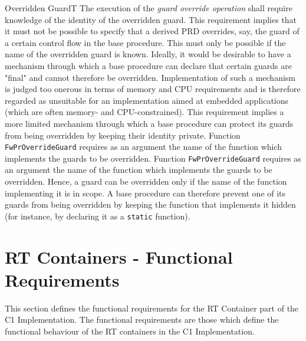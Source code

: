 \documentclass[a4paper,10pt]{article}
\let\stdsection\section
\renewcommand\section{\newpage\stdsection}
\newenvironment{fw_req_note}[7]
{\addtocounter{subsubsection}{1}
	\hspace{0.2cm}\textbf{FW-\arabic{section}.\arabic{subsection}.\arabic{subsubsection}/#2
	\hspace{0.8cm} #1}
	\vspace{-10pt}
\begin{longtable}{p{2.7cm}P{8.5cm}}
\hline
\textsc{Requirement} & #3 \\
\textsc{Note} & #4 \\
\textsc{Justification} & #5 \\
\textsc{Implementation} & #6  \\ 
\textsc{Verification} & #7  \\
\hline
}
{\end{longtable}}
\begin{document}
\begin{fw_req_note}{Overridden Guard}{T}
{The execution of the \emph{guard override operation} shall require knowledge of the identity of the overridden guard.}
{This requirement implies that it must not be possible to specify that a derived PRD overrides, say, the guard of a certain control flow in the base procedure. 
This must only be possible if the name of the overridden guard is known.}
{Ideally, it would be desirable to have a mechanism through which a base procedure can declare that certain guards 
are "final" and cannot therefore be overridden. Implementation of such a mechanism is judged too onerous in terms of memory and CPU requirements 
and is therefore regarded as unsuitable for an implementation aimed at embedded applications (which are often memory- and CPU-constrained). 
This requirement implies a more limited mechanism through which a base procedure can protect its guards from being overridden by keeping 
their identity private.}
{Function \texttt{FwPrOverrideGuard} requires as an argument the name of the function which implements the guards to be overridden.} 
{Function \texttt{FwPrOverrideGuard} requires as an argument the name of the function which implements the guards to be overridden. 
Hence, a guard can be overridden only if the name of the function implementing it is in scope. A base procedure can therefore prevent one of its guards 
from being overridden by keeping the function that implements it hidden (for instance, by declaring it as a \texttt{static} function).}
\end{fw_req_note}



\section{RT Containers - Functional Requirements}\label{sec:rtFncReqs}
This section defines the functional requirements for the RT Container part of the C1 Implementation. The functional requirements are those which define the functional behaviour of the RT containers in the C1 Implementation.
\end{document}
